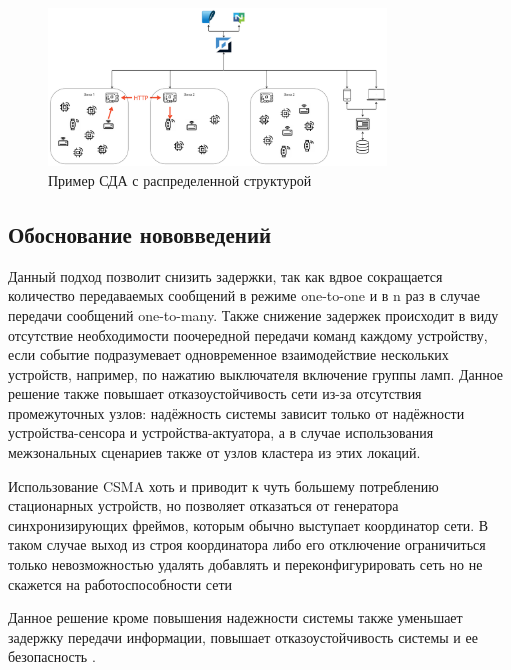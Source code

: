 \documentclass[14pt,a4paper]{extarticle}
\begin{document}
\begin{figure}[h]
    \centering
    \includegraphics[width=0.8\textwidth]{images/GlobalSystemDesing.png}
    \caption{Пример СДА с распределенной структурой}
    \label{fig:GlobalSystemDesing}
\end{figure}

\subsection{Обоснование нововведений}

Данный подход позволит снизить задержки, так как вдвое сокращается количество передаваемых сообщений в режиме one-to-one и в n раз в случае передачи сообщений one-to-many. Также
снижение задержек происходит в виду отсутствие необходимости поочередной передачи команд каждому устройству, если событие подразумевает одновременное взаимодействие нескольких
устройств, например, по нажатию выключателя включение группы ламп. Данное решение также повышает отказоустойчивость сети из-за отсутствия промежуточных узлов: надёжность системы
зависит только от надёжности устройства-сенсора и устройства-актуатора, а в случае использования межзональных сценариев также от узлов кластера из этих локаций.

Использование CSMA хоть и приводит к чуть большему потреблению стационарных устройств, но позволяет отказаться от генератора синхронизирующих фреймов, которым обычно выступает
координатор сети. В таком случае выход из строя координатора либо его отключение ограничиться только невозможностью удалять добавлять и переконфигурировать сеть но не скажется на работоспособности сети

Данное решение кроме повышения надежности системы также уменьшает задержку передачи информации, повышает отказоустойчивость системы и ее безопасность \cite{SecuritySmartHome, SecuritySmartHome2}.
\end{document}
